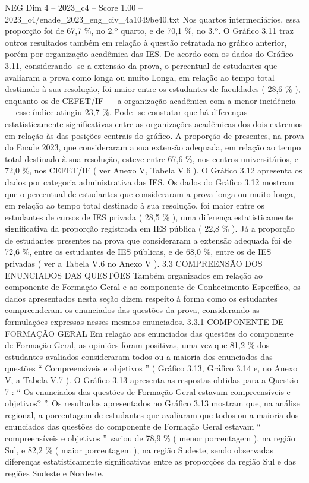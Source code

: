 \begin{textsample}{NEG Dim 4 – 2023\_c4 – Score 1.00 – 2023\_c4/enade\_2023\_eng\_civ\_4a1049be40.txt}
Nos quartos intermediários, essa proporção foi de 67,7 \%, no 2.º quarto, e de 70,1 \%, no 3.º.
O Gráfico 3.11 traz outros resultados também em relação à questão retratada no gráfico anterior, porém por organização acadêmica das IES.
De acordo com os dados do Gráfico 3.11, considerando -se a extensão da prova, o percentual de estudantes que avaliaram a prova como longa ou muito Longa, em relação ao tempo total destinado à sua resolução, foi maior entre os estudantes de faculdades ( 28,6 \% ), enquanto os de CEFET/IF — a organização acadêmica com a menor incidência — esse índice atingiu 23,7 \%.
Pode -se constatar que há diferenças estatisticamente significativas entre as organizações acadêmicas dos dois extremos em relação às das posições centrais do gráfico.
A proporção de presentes, na prova do Enade 2023, que consideraram a sua extensão adequada, em relação ao tempo total destinado à sua resolução, esteve entre 67,6 \%, nos centros universitários, e 72,0 \%, nos CEFET/IF ( ver Anexo V, Tabela V.6 ).
O Gráfico 3.12 apresenta os dados por categoria administrativa das IES.
Os dados do Gráfico 3.12 mostram que o percentual de estudantes que consideraram a prova longa ou muito longa, em relação ao tempo total destinado à sua resolução, foi maior entre os estudantes de cursos de IES privada ( 28,5 \% ), uma diferença estatisticamente significativa da proporção registrada em IES pública ( 22,8 \% ).
Já a proporção de estudantes presentes na prova que consideraram a extensão adequada foi de 72,6 \%, entre os estudantes de IES públicas, e de 68,0 \%, entre os de IES privadas ( ver a Tabela V.6 no Anexo V ). 3.3 COMPREENSÃO DOS ENUNCIADOS DAS QUESTÕES Também organizados em relação ao componente de Formação Geral e ao componente de Conhecimento Específico, os dados apresentados nesta seção dizem respeito à forma como os estudantes compreenderam os enunciados das questões da prova, considerando as formulações expressas nesses mesmos enunciados. 3.3.1 COMPONENTE DE FORMAÇÃO GERAL Em relação aos enunciados das questões do componente de Formação Geral, as opiniões foram positivas, uma vez que 81,2 \% dos estudantes avaliados consideraram todos ou a maioria dos enunciados das questões “ Compreensíveis e objetivos ” ( Gráfico 3.13, Gráfico 3.14 e, no Anexo V, a Tabela V.7 ).
O Gráfico 3.13 apresenta as respostas obtidas para a Questão 7 : “ Os enunciados das questões de Formação Geral estavam compreensíveis e objetivos? ”.
Os resultados apresentados no Gráfico 3.13 mostram que, na análise regional, a porcentagem de estudantes que avaliaram que todos ou a maioria dos enunciados das questões do componente de Formação Geral estavam “ compreensíveis e objetivos ” variou de 78,9 \% ( menor porcentagem ), na região Sul, e 82,2 \% ( maior porcentagem ), na região Sudeste, sendo observadas diferenças estatisticamente significativas entre as proporções da região Sul e das regiões Sudeste e Nordeste.

\end{textsample}
